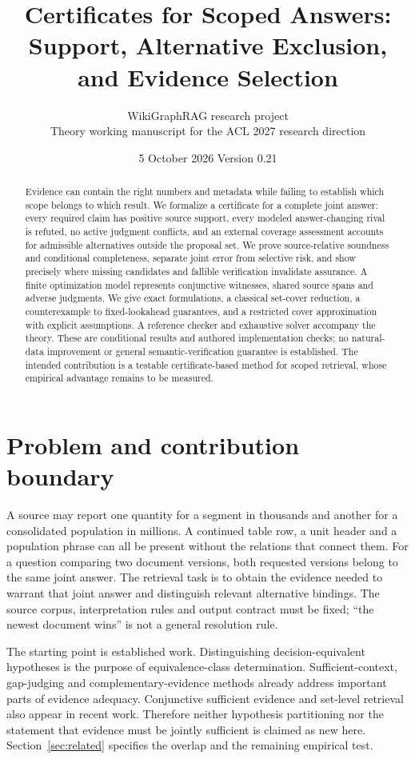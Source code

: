 \documentclass[11pt]{article}
\title{Certificates for Scoped Answers:\\Support, Alternative Exclusion, and Evidence Selection}
\author{WikiGraphRAG research project\\Theory working manuscript for the ACL 2027 research direction}
\date{5 October 2026 \quad Version 0.21}
\theoremstyle{definition}
\theoremstyle{remark}
\begin{document}
\maketitle
\begin{abstract}
Evidence can contain the right numbers and metadata while failing to establish
which scope belongs to which result. We formalize a certificate for a complete
joint answer: every required claim has positive source support, every modeled
answer-changing rival is refuted, no active judgment conflicts, and an external
coverage assessment accounts for admissible alternatives outside the proposal
set. We prove source-relative soundness and conditional completeness, separate
joint error from selective risk, and show precisely where missing candidates
and fallible verification invalidate assurance. A finite optimization model
represents conjunctive witnesses, shared source spans and adverse judgments.
We give exact formulations, a classical set-cover reduction, a counterexample
to fixed-lookahead guarantees, and a restricted cover approximation with
explicit assumptions. A reference checker and exhaustive solver accompany the
theory. These are conditional results and authored implementation checks;
no natural-data improvement or general semantic-verification guarantee is
established. The intended contribution is a testable certificate-based method
for scoped retrieval, whose empirical advantage remains to be measured.
\end{abstract}

\section{Problem and contribution boundary}
\label{sec:position}
A source may report one quantity for a segment in thousands and another for a
consolidated population in millions. A continued table row, a unit header and a
population phrase can all be present without the relations that connect them.
For a question comparing two document versions, both requested versions belong
to the same joint answer. The retrieval task is to obtain the evidence needed
to warrant that joint answer and distinguish relevant alternative bindings.
The source corpus, interpretation rules and output contract must be fixed;
``the newest document wins'' is not a general resolution rule.

The starting point is established work. Distinguishing decision-equivalent
hypotheses is the purpose of equivalence-class determination. Sufficient-context,
gap-judging and complementary-evidence methods already address important parts
of evidence adequacy. Conjunctive sufficient evidence and set-level retrieval
also appear in recent work. Therefore neither hypothesis partitioning nor the
statement that evidence must be jointly sufficient is claimed as new here.
Section~\ref{sec:related} specifies the overlap and the remaining empirical test.
\end{document}
